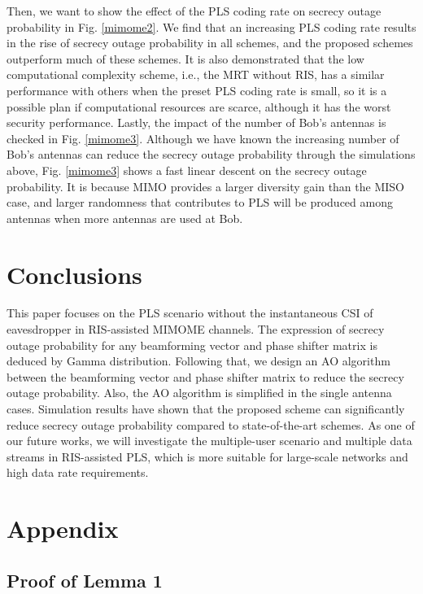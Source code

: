 \documentclass[journal]{IEEEtran}
\theoremstyle{definition}
\begin{document}
Then, we want to show the effect of the PLS coding rate on secrecy outage probability in Fig. \ref{mimome2}. We find that an increasing PLS coding rate results in the rise of  secrecy outage probability in all schemes, and the proposed schemes outperform much of these schemes. It is also demonstrated that the low computational complexity scheme, i.e., the MRT without RIS, has a similar performance with others when the preset PLS coding rate is small, so it is a possible plan if computational resources are scarce, although it has the worst security performance. Lastly, the impact of the number of Bob's antennas is checked in Fig. \ref{mimome3}. Although we have known the increasing number of Bob's antennas can reduce the secrecy outage probability through the simulations above, Fig. \ref{mimome3} shows a fast linear descent on the secrecy outage probability. It is because MIMO provides a larger diversity gain than the MISO case, and larger randomness that contributes to PLS will be produced among antennas when more antennas are used at Bob.

\section{Conclusions} \label{conclusions}
This paper focuses on the PLS scenario without the instantaneous CSI of eavesdropper in RIS-assisted MIMOME channels. The expression of secrecy outage probability for any beamforming vector and phase shifter matrix is deduced by Gamma distribution. Following that, we design an AO algorithm between the beamforming vector and phase shifter matrix to reduce the secrecy outage probability. Also, the AO algorithm is simplified in the single antenna cases. Simulation results have shown that the proposed scheme can significantly reduce secrecy outage probability compared to state-of-the-art schemes. As one of our future works, we will investigate the multiple-user scenario and multiple data streams in RIS-assisted PLS, which is more suitable for large-scale networks and high data rate requirements.

\section*{Appendix}

\subsection{Proof of Lemma 1}\label{pol1}
\end{document}
